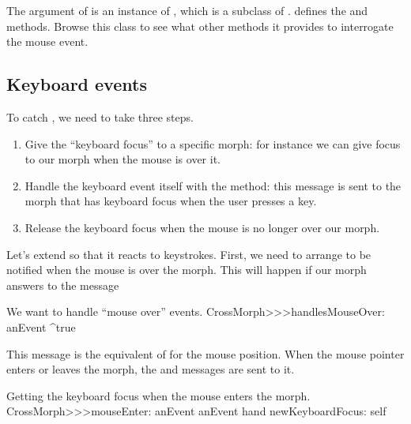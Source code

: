 \documentclass[a4paper,10pt,twoside]{book}
\begin{document}
The  argument of  is an instance of \mbox{,} which is a subclass of .  defines the  and  methods. Browse this class to see what other methods it provides to interrogate the mouse event.

\subsection{Keyboard events}

To catch , we need to take three steps.
\begin{enumerate}
	\item Give the ``keyboard focus'' to a specific morph: for instance we can give focus to our morph when the mouse is over it.
	\item Handle the keyboard event itself with the  method: this message is sent to the morph that has keyboard focus when the user presses a key.
	\item Release the keyboard focus when the mouse is no longer over our morph.
\end{enumerate}

Let's extend  so that it reacts to keystrokes.
First, we need to arrange to be notified when the mouse is over the morph.
This will happen if our morph answers  to the  message

\begin{method}{We want to handle ``mouse over'' events.} 
CrossMorph>>>handlesMouseOver: anEvent
	^true
\end{method}

\noindent
This message is the equivalent of  for the mouse position.
When the mouse pointer enters or leaves the morph, the  and  messages are sent to it.

\begin{method}{Getting the keyboard focus when the mouse enters the morph.}
CrossMorph>>>mouseEnter: anEvent
	anEvent hand newKeyboardFocus: self
\end{method}
\end{document}
